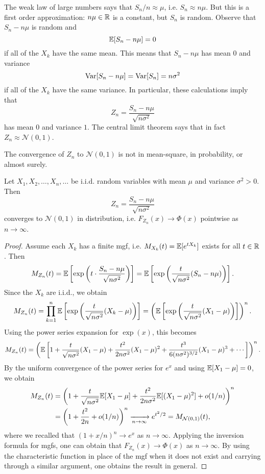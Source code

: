 \begin{remark}
  The weak law of large numbers says that
  $S_n / n \approx \mu$, i.e.
  $S_n \approx n \mu$. But this is a first order
  approximation: $n \mu \in \mathbb{R}$ is a constant,
  but $S_n$ is random. Observe that
  $S_n - n\mu$ is random and
  \[
    \mathbb{E}[S_n - n\mu] = 0
  \]
  if all of the $X_k$ have the same mean.
  This means that $S_n - n\mu$ has
  mean $0$ and variance
  \[
    \operatorname{Var}[S_n - n\mu]
    = \operatorname{Var}[S_n] = n\sigma^2
  \]
  if all of the $X_k$ have the same variance.
  In particular, these calculations imply that
  \[
    Z_n = \frac{S_n - n\mu}{\sqrt{n\sigma^2}}
  \]
  has mean $0$ and variance $1$. The central
  limit theorem says that in fact
  $Z_n \approx \mathcal{N}(0, 1)$.
\end{remark}

\begin{remark}
  The convergence of $Z_n$ to
  $\mathcal{N}(0, 1)$ is not in mean-square,
  in probability, or almost surely.
\end{remark}

\begin{theorem}
  Let $X_1, X_2, \dots, X_n, \dots$ be i.i.d.
  random variables with mean $\mu$ and
  variance $\sigma^2 > 0$. Then
  \[
    Z_n = \frac{S_n - n\mu}{\sqrt{n\sigma^2}}
  \]
  converges to $\mathcal{N}(0, 1)$ in distribution,
  i.e.
  $F_{Z_n}(x) \to \Phi(x)$
  pointwise as $n \to \infty$.
\end{theorem}

\begin{proof}
  Assume each $X_k$ has a finite mgf, i.e. $M_{X_k}(t) = \mathbb{E}[e^{tX_k}]$
  exists for all $t \in \mathbb{R}$. Then
  \[
    M_{Z_n}(t)
    = \mathbb{E}\left[\exp\left(t \cdot \frac{S_n - n\mu}{\sqrt{n\sigma^2}}\right)\right]
    = \mathbb{E}\left[\exp\left(\frac{t}{\sqrt{n \sigma^2}} (S_n - n\mu)\right)\right].
  \]
  Since the $X_k$ are i.i.d., we obtain
  \[
    M_{Z_n}(t) = \prod_{k = 1}^n \mathbb{E}\left[\exp\left(\frac{t}{\sqrt{n \sigma^2}} (X_k - \mu)\right)\right]
    = \left(\mathbb{E}\left[\exp\left(\frac{t}{\sqrt{n \sigma^2}} (X_1 - \mu)\right)\right]\right)^n.
  \]
  Using the power series expansion for
  $\exp(x)$, this becomes
  \[
    M_{Z_n}(t)
    = \left(\mathbb{E}\left[1 + \frac{t}{\sqrt{n\sigma^2}}(X_1 - \mu) + \frac{t^2}{2 n \sigma^2}(X_1 - \mu)^2 + \frac{t^3}{6 (n\sigma^2)^{3 / 2}} (X_1 - \mu)^3 + \cdots\right]\right)^n.
  \]
  By the uniform convergence of the
  power series for $e^x$ and using
  $\mathbb{E}[X_1 - \mu] = 0$, we obtain
  \begin{align*}
    M_{Z_n}(t)
    &= \left(1 + \frac{t}{\sqrt{n\sigma^2}} \mathbb{E}[X_1 - \mu] + \frac{t^2}{2n\sigma^2} \mathbb{E}[(X_1 - \mu)^2] + o(1 / n)\right)^n \\
    &= \left(1 + \frac{t^2}{2n} + o(1 / n)\right)^n
    \xrightarrow[n \to \infty]{} e^{t^2 / 2}
    = M_{\mathcal{N}(0, 1)}(t),
  \end{align*}
  where we recalled that
  $(1 + x / n)^n \to e^x$ as $n \to \infty$.
  Applying the inversion formula for mgfs, one
  can obtain that $F_{Z_n}(x) \to \Phi(x)$
  as $n \to \infty$. By using the characteristic
  function in place of the mgf when it does not
  exist and carrying through
  a similar argument, one obtains the result in
  general.
\end{proof}

